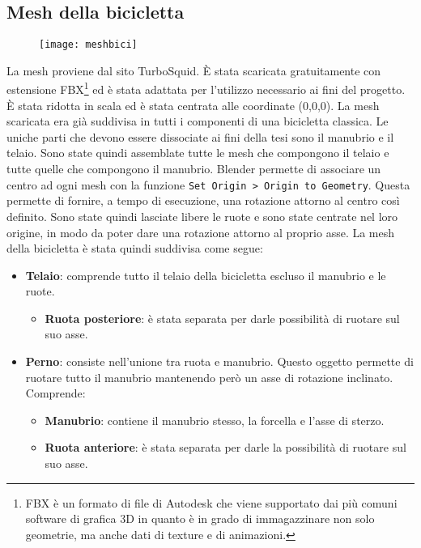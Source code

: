 \subsection{Mesh della bicicletta}
 \begin{figure}[htb]
    \centering
    \texttt{[image: meshbici]}
\end{figure}
\noindent La mesh proviene dal sito TurboSquid. È stata scaricata gratuitamente con estensione FBX\footnote{FBX è un formato di file di Autodesk che viene supportato dai più comuni software di grafica 3D in quanto è in grado di immagazzinare non solo geometrie, ma anche dati di texture e di animazioni.} ed è stata adattata per l'utilizzo necessario ai fini del progetto. È stata ridotta in scala ed è stata centrata alle coordinate (0,0,0). La mesh scaricata era già suddivisa in tutti i componenti di una bicicletta classica. Le uniche parti che devono essere dissociate ai fini della tesi sono il manubrio e il telaio. Sono state quindi assemblate tutte le mesh che compongono il telaio e tutte quelle che compongono il manubrio. Blender permette di associare un centro ad ogni mesh con la funzione \texttt{Set Origin > Origin to Geometry}. Questa permette di fornire, a tempo di esecuzione, una rotazione attorno al centro così definito. Sono state quindi lasciate libere le ruote e sono state centrate nel loro origine, in modo da poter dare una rotazione attorno al proprio asse.
\noindent La mesh della bicicletta è stata quindi suddivisa come segue:
\begin{itemize}
  \item \textbf{Telaio}: comprende tutto il telaio della bicicletta escluso il manubrio e le ruote.
	\begin{itemize}
  \item \textbf{Ruota posteriore}: è stata separata per darle possibilità di ruotare sul suo asse.
 \end{itemize}
  \item \textbf{Perno}: consiste nell'unione tra ruota e manubrio. Questo oggetto permette di ruotare tutto il manubrio mantenendo però un asse di rotazione inclinato. Comprende:
 \begin{itemize}
 \item \textbf{Manubrio}: contiene il manubrio stesso, la forcella e l'asse di sterzo.
 \item \textbf{Ruota anteriore}: è stata separata per darle la possibilità di ruotare sul suo asse.
 \end{itemize}
\end{itemize}

